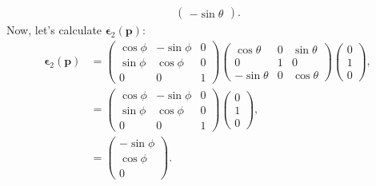 \begin{enumerate}
\begin{align*}
\begin{pmatrix}
        -\sin \theta
    \end{pmatrix}.
\end{align*}
Now, let’s calculate \( \boldsymbol{\epsilon}_2(\mathbf{p}) \):
\begin{align*}
    \boldsymbol{\epsilon}_2(\mathbf{p}) &= 
    \begin{pmatrix}
        \cos \phi & -\sin \phi & 0 \\
        \sin \phi & \cos \phi & 0 \\
        0 & 0 & 1
    \end{pmatrix}
    \begin{pmatrix}
        \cos \theta & 0 & \sin \theta \\
        0 & 1 & 0 \\
        -\sin \theta & 0 & \cos \theta
    \end{pmatrix}
    \begin{pmatrix}
        0 \\
        1 \\
        0
    \end{pmatrix}, \nonumber \\
    &= 
    \begin{pmatrix}
        \cos \phi & -\sin \phi & 0 \\
        \sin \phi & \cos \phi & 0 \\
        0 & 0 & 1
    \end{pmatrix}
    \begin{pmatrix}
        0 \\
        1 \\
        0
    \end{pmatrix}, \nonumber \\
    &= 
    \begin{pmatrix}
        -\sin \phi \\
        \cos \phi \\
        0
    \end{pmatrix}.
\end{align*}


\end{enumerate}
